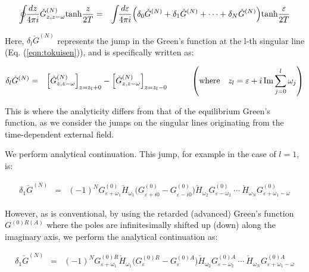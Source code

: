 \documentclass[uplatex,a4j,12pt,dvipdfmx]{jsarticle}
\begin{document}
\begin{eqnarray}
	\oint \!\! \dfrac{dz}{4 \pi i}
	\check{G}^{(N)}_{z,z - \omega}
	{\rm tanh} \dfrac{z}{2 T}
	&=&
	\int \! \! \dfrac{d \varepsilon}{4 \pi i}
	\Big(
	\delta_{0} \check{G}^{(N)}
	+
	\delta_{1} \check{G}^{(N)}
	+
	\cdots
	+
	\delta_{N} \check{G}^{(N)}
	\Big)
	{\rm tanh} \dfrac{\varepsilon}{2 T}
\end{eqnarray}

Here, $\delta_{l} \check{G}^{(N)}$ represents the jump in the Green's function at the l-th singular line (Eq. (\ref{eqn:tokuisen})), and is specifically written as:

\begin{eqnarray}
	\delta_{l} \check{G}^{(N)}
	&=&
	\Big[ \check{G}^{(N)}_{z,z - \omega} \Big]_{z = z_{l} + 0}
	-
	\Big[ \check{G}^{(N)}_{z,z - \omega} \Big]_{z = z_{l} - 0}
	\hspace{10mm}
	\left( {\rm where} \ \ \ z_{l} = \varepsilon + i \ \! {\rm Im} \sum^{l}_{j=0} \omega_{j} \right)
\end{eqnarray}

This is where the analyticity differs from that of the equilibrium Green's function, as we consider the jumps on the singular lines originating from the time-dependent external field.






We perform analytical continuation.
This jump, for example in the case of $l=1$, is:

\begin{eqnarray}
	\delta_{1} \check{G}^{(N)}
	&=&
	(-1)^{N}
	G^{(0)}_{\varepsilon + \omega_{1} }
	\check{H}_{\omega_{1}}
	\Big( G^{(0)}_{\varepsilon + i 0 } - G^{(0)}_{\varepsilon - i 0 } \Big)
	\check{H}_{\omega_{2}}
	G^{(0)}_{\varepsilon - \omega_{2} }
	\ \cdots \
	\check{H}_{\omega_{N}}
	G^{(0)}_{\varepsilon + \omega_{1} - \omega }
\end{eqnarray}

However, as is conventional, by using the retarded (advanced) Green's function $G^{(0) R(A)}$ where the poles are infinitesimally shifted up (down) along the imaginary axis, we perform the analytical continuation as:

\begin{eqnarray}
	\delta_{1} \check{G}^{(N)}
	&=&
	(-1)^{N}
	G^{(0)R}_{\varepsilon + \omega_{1} }
	\check{H}_{\omega_{1}}
	\Big( G^{(0)R}_{\varepsilon} - G^{(0)A}_{\varepsilon} \Big)
	\check{H}_{\omega_{2}}
	G^{(0)A}_{\varepsilon - \omega_{2} }
	\ \cdots \
	\check{H}_{\omega_{N}}
	G^{(0)A}_{\varepsilon + \omega_{1} - \omega }
\end{eqnarray}
\end{document}

